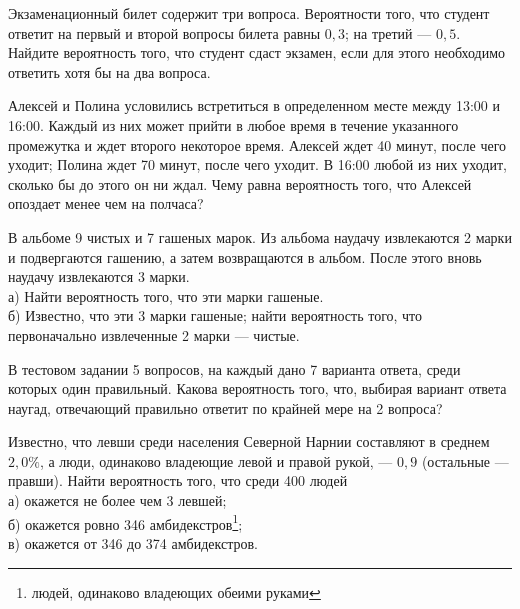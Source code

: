 \newpage\setcounter{zad}{0}



\begin{zkrW}{20}\noindent 
	Экзаменационный билет содержит три вопроса. Вероятности того, что студент ответит на первый и второй вопросы билета равны $0{,}3$; на третий --- $0{,}5$. Найдите вероятность того, что студент сдаст экзамен, если для этого необходимо ответить хотя бы на два вопроса.
 
\end{zkrW}

\begin{zkrW}{20}\noindent 
	Алексей и Полина условились встретиться в определенном месте между 13:00 и 16:00. Каждый из них может прийти в любое время в течение указанного промежутка и ждет второго некоторое время. Алексей ждет 40 минут, после чего уходит; Полина ждет 70 минут, после чего уходит. В 16:00 любой из них уходит, сколько бы до этого он ни ждал. Чему равна вероятность того, что Алексей опоздает менее чем на полчаса?
 
\end{zkrW}

\begin{zkrW}{20}\noindent 
	В альбоме 9 чистых и 7 гашеных марок. Из альбома наудачу извлекаются 2 марки и подвергаются гашению, а затем возвращаются в альбом. После этого вновь наудачу извлекаются 3 марки. \\ \indent а) Найти вероятность того, что эти марки гашеные. \\ \indent б) Известно, что эти 3 марки гашеные; найти вероятность того, что первоначально извлеченные 2 марки --- чистые.
 
\end{zkrW}

\begin{zkrW}{20}\noindent 
	В тестовом задании 5 вопросов, на каждый дано 7 варианта ответа, среди которых один правильный. Какова вероятность того, что, выбирая вариант ответа наугад, отвечающий правильно ответит по крайней мере на 2 вопроса?
 
\end{zkrW}

\begin{zkrW}{20}\noindent 
	Известно, что левши среди населения Северной Нарнии составляют в среднем $2{,}0\%$, а люди, одинаково владеющие левой и правой рукой, --- $0{,}9$ (остальные --- правши). Найти вероятность того, что среди 400 людей \\ \indent а) окажется не более чем 3 левшей; \\ \indent б) окажется ровно 346 амбидекстров\footnote{людей, одинаково владеющих обеими руками}; \\ \indent в) окажется от 346 до 374 амбидекстров.
 
\end{zkrW}

